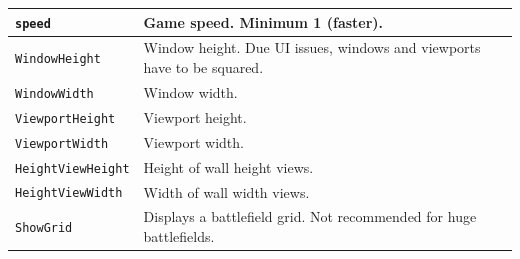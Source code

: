 \documentclass[tog]{acmsiggraph}
\begin{document}
\begin{tabularx}{0.48\textwidth}{ |X|X| }
\hline 
 \texttt{speed} & Game speed. Minimum 1 (faster). \\
 \hline
 \texttt{WindowHeight} & Window height. Due UI issues, windows and viewports have to be squared. \\
 \hline
 \texttt{WindowWidth} & Window width. \\
 \hline
 \texttt{ViewportHeight} & Viewport height. \\
 \hline
 \texttt{ViewportWidth} & Viewport width. \\
 \hline 
 \texttt{HeightViewHeight} & Height of wall height views. \\
 \hline
 \texttt{HeightViewWidth} & Width of wall width views. \\
 \hline
 \texttt{ShowGrid} & Displays a battlefield grid. Not recommended for huge battlefields. \\
 \hline
\end{tabularx}


















 
\end{document}
